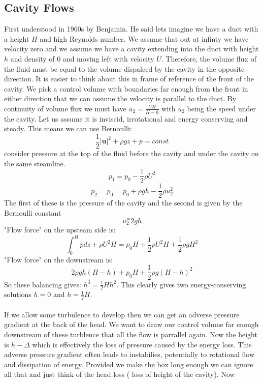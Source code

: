 \documentclass{article}
\begin{document}
           \subsection{Cavity Flows}
           First understood in 1960s by Benjamin. He said lets imagine we have a duct with a height $H$ and high Reynolds number. We assume that out at infinty we have velocity zero and we assume we have a cavity extending into the duct with height $h$ and density of 0 and moving left with velocity $U$. Therefore, the volume flux of the fluid must be equal to the volume dispalced by the cavity in the opposite direction. It is easier to think about this in frame of reference of the front of the cavity. We pick a control volume with boundaries far enough from the front in either direction that we can assume the velocity is parallel to the duct. By continuity of volume flux we must have $u_2 = \frac{UH}{H-h}$ with $u_2$ being the speed under the cavity. Let us assume it is inviscid, irrotational and energy conserving and steady. This means we can use Bernoulli:
           $$
            \frac{1}{2} |\bm u|^2 + \rho g z + p = const
           $$
           consider pressure at the top of the fluid before the cavity and under the cavity on the same steamline.           $$
            p_1 = p_0 - \frac{1}{2} \rho U^2
           $$
           $$
           p_2 = p_0  = p_0 + \rho g h - \frac{1}{2} \rho u_2^2
           $$
           The first of these is the pressure of the cavity and the second is given by the Bernoulli constant \\
           $$
            u_2^ = 2 gh
           $$
           "Flow force" on the upsteam side is:
           $$
           \int_0^H p dz + \rho U^2 H = p_0 H + \frac{1}{2} \rho U^2 H + \frac{1}{2} \rho g H^2
           $$
           "Flow force" on the downstream is:
           $$
            2\rho g h( H-h) + p_0 H + \frac{1}{2} \rho g( H-h)^2
           $$
           So these balancing gives: $h^3 = \frac{1}{2} Hh^2$. This clearly gives two energy-conserving solutions $h=0$ and $h = \frac{1}{2} H$.\\\\
        If we allow some turbulence to develop then we can get an adverse pressure gradient at the back of the head. We want to draw our control volume far enough downstream of these turblence that all the flow is parrallel again. Now the height is $h - \Delta$ which is effectively the loss of pressure caused by the energy loss. This adverse pressure gradient often leads to instabilies, potentially to rotational flow and dissipation of energy. Provided we make the box long enough we can ignore all that and just think of the head loss ( loss of height of the cavity). Now
\end{document}
